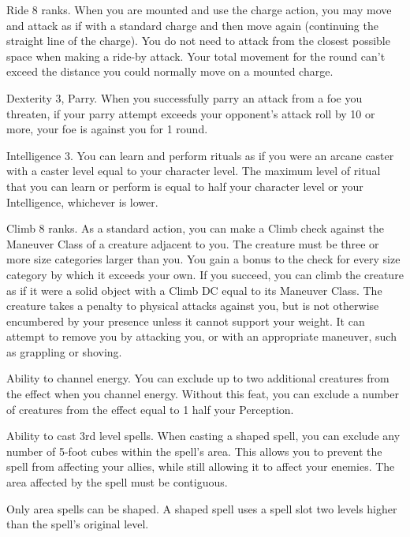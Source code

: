 \featpre Ride 8 ranks.
\featben When you are mounted and use the charge action, you may move and attack as if with a standard charge and then move again (continuing the straight line of the charge).
You do not need to attack from the closest possible space when making a ride-by attack.
Your total movement for the round can't exceed the distance you could normally move on a mounted charge.

\featpre Dexterity 3, Parry.
\featben When you successfully parry an attack from a foe you threaten, if your parry attempt exceeds your opponent's attack roll by 10 or more, your foe is  against you for 1 round.

\featpre Intelligence 3.
\featben You can learn and perform rituals as if you were an arcane caster with a caster level equal to your character level.
The maximum level of ritual that you can learn or perform is equal to half your character level or your Intelligence, whichever is lower.

\featpre Climb 8 ranks.
\featben As a standard action, you can make a Climb check against the Maneuver Class of a creature adjacent to you.
The creature must be three or more size categories larger than you.
You gain a  bonus to the check for every size category by which it exceeds your own.
If you succeed, you can climb the creature as if it were a solid object with a Climb DC equal to its Maneuver Class.
The creature takes a  penalty to physical attacks against you, but is not otherwise encumbered by your presence unless it cannot support your weight.
It can attempt to remove you by attacking you, or with an appropriate maneuver, such as grappling or shoving.

\featpres
Ability to channel energy.
\featben You can exclude up to two additional creatures from the effect when you channel energy.
Without this feat, you can exclude a number of creatures from the effect equal to 1 \add half your Perception.

\featpre Ability to cast 3rd level spells.
\featben When casting a shaped spell, you can exclude any number of 5-foot cubes within the spell's area.
This allows you to prevent the spell from affecting your allies, while still allowing it to affect your enemies.
The area affected by the spell must be contiguous.

Only area spells can be shaped.
A shaped spell uses a spell slot two levels higher than the spell's original level.

